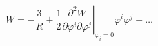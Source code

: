 \begin{equation}
W = -\frac{3}{R} + \frac{1}{2} \left. \frac{\partial^2 W}{\partial \varphi^i
  \partial \varphi^j }\right|_{\varphi_i=0} \varphi^i \varphi^j + \ldots
\end{equation}


